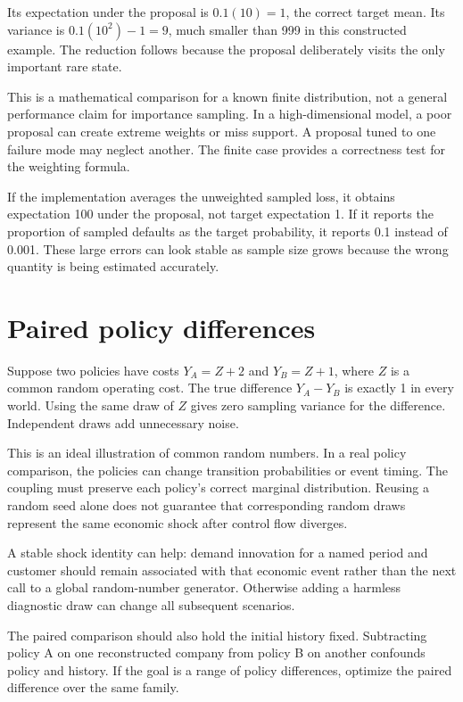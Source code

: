 Its expectation under the proposal is $0.1(10)=1$, the correct target mean. Its variance is $0.1(10^2)-1=9$, much smaller than 999 in this constructed example. The reduction follows because the proposal deliberately visits the only important rare state.

This is a mathematical comparison for a known finite distribution, not a general performance claim for importance sampling. In a high-dimensional model, a poor proposal can create extreme weights or miss support. A proposal tuned to one failure mode may neglect another. The finite case provides a correctness test for the weighting formula.

If the implementation averages the unweighted sampled loss, it obtains expectation 100 under the proposal, not target expectation 1. If it reports the proportion of sampled defaults as the target probability, it reports 0.1 instead of 0.001. These large errors can look stable as sample size grows because the wrong quantity is being estimated accurately.

\section{Paired policy differences}
Suppose two policies have costs $Y_A=Z+2$ and $Y_B=Z+1$, where $Z$ is a common random operating cost. The true difference $Y_A-Y_B$ is exactly 1 in every world. Using the same draw of $Z$ gives zero sampling variance for the difference. Independent draws add unnecessary noise.

This is an ideal illustration of common random numbers. In a real policy comparison, the policies can change transition probabilities or event timing. The coupling must preserve each policy's correct marginal distribution. Reusing a random seed alone does not guarantee that corresponding random draws represent the same economic shock after control flow diverges.

A stable shock identity can help: demand innovation for a named period and customer should remain associated with that economic event rather than the next call to a global random-number generator. Otherwise adding a harmless diagnostic draw can change all subsequent scenarios.

The paired comparison should also hold the initial history fixed. Subtracting policy A on one reconstructed company from policy B on another confounds policy and history. If the goal is a range of policy differences, optimize the paired difference over the same family.

